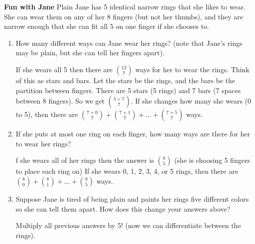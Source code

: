 \question \textbf{Fun with Jane} \newline
Plain Jane has 5 identical narrow rings that she likes to wear. She can wear them on any of her 8 fingers (but not her thumbs), and they are narrow enough that she can fit all 5 on one finger if she chooses to. 
\begin{enumerate}[label=(\alph*)]
\item  How many different ways can Jane wear her rings? (note that Jane’s rings may be plain, but she can tell her fingers apart). 
\begin{solution}
If she wears all 5 then there are ${12 \choose 7}$ ways for her to wear the rings. Think of this as stars and bars. Let the stars be the rings, and the bars be the partition between fingers. There are 5 stars (5 rings) and 7 bars (7 spaces between 8 fingers). So we get ${5+7 \choose 7}$.
If she changes how many she wears (0 to 5), then there are ${7+0 \choose 7} + {7+1 \choose 7} + \dotsc + {7+5 \choose 7}$ ways.
\end{solution}

\item If she puts at most one ring on each finger, how many ways are there for her to wear her rings? 
\begin{solution}
f she wears all of her rings then the answer is $8 \choose 5$ (she is choosing 5 fingers to place each ring on)
If she wears 0, 1, 2, 3, 4, or 5 rings, then there are ${8 \choose 0} + {8 \choose 1} + \dotsc + {8 \choose 5}$ ways.
\end{solution}

\item Suppose Jane is tired of being plain and paints her rings five different colors so she can tell them apart. How does this change your answers above? 
\begin{solution}
Multiply all previous answers by 5! (now we can differentiate between the rings).
\end{solution}
\end{enumerate}
